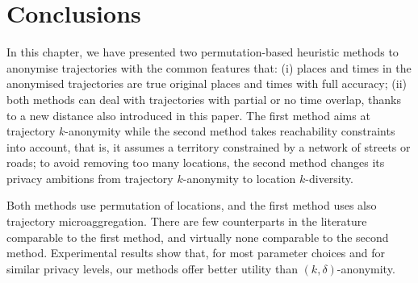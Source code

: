 \section{Conclusions}

In this chapter, we have presented two permutation-based heuristic
methods to anonymise trajectories
with the common features that: (i)
places and times in the anonymised trajectories are true original places
and times with full accuracy;
(ii) both methods can deal with trajectories with partial or no time
overlap, thanks to a new distance also introduced in this paper.
The first method aims at trajectory $k$-anonymity while the second method takes reachability constraints into account,
that is, it assumes a territory constrained
by a network of streets or roads; to avoid
removing too many locations, the second method changes its privacy
ambitions from trajectory $k$-anonymity to location $k$-diversity.

Both methods use permutation of locations, and the first method
uses also trajectory microaggregation.
There are few counterparts in the literature comparable to the
first method, and virtually none comparable to the
second method.
Experimental results show that, for most parameter choices
and for similar privacy levels,
our methods offer better utility
than $(k,\delta)$-anonymity.

